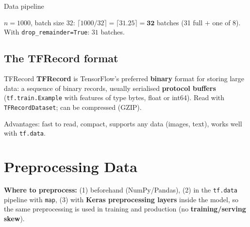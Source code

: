 \begin{drawit}{Data pipeline}
\centering
{}
\end{drawit}

\begin{numer}
$n=1000$, batch size $32$: $\lceil1000/32\rceil=\lceil31.25\rceil=\mathbf{32}$ batches (31 full $+$ one of 8).\\ With \texttt{drop\_remainder=True}: $31$ batches.
\end{numer}

\subsection{The TFRecord format}
\begin{dfn}{TFRecord}
\textbf{TFRecord} is TensorFlow's preferred \textbf{binary} format for storing large data: a sequence of binary records, usually serialised \textbf{protocol buffers} (\texttt{tf.train.Example} with features of type bytes, float or int64). Read with \texttt{TFRecordDataset}; can be compressed (GZIP).
\end{dfn}
Advantages: fast to read, compact, supports any data (images, text), works well with \texttt{tf.data}.

\section{Preprocessing Data}
\textbf{Where to preprocess:} (1) beforehand (NumPy/Pandas), (2) in the \texttt{tf.data} pipeline with \texttt{map}, (3) with \textbf{Keras preprocessing layers} inside the model, so the same preprocessing is used in training and production (no \textbf{training/serving skew}).


